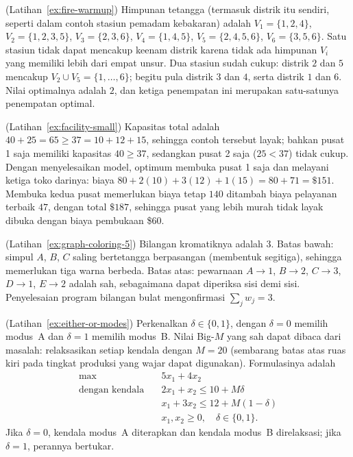 \begin{solution}(Latihan~\ref{ex:fire-warmup})
Himpunan tetangga (termasuk distrik itu sendiri, seperti dalam contoh stasiun pemadam kebakaran) adalah $V_1 = \{1,2,4\}$, $V_2 = \{1,2,3,5\}$, $V_3 = \{2,3,6\}$, $V_4 = \{1,4,5\}$, $V_5 = \{2,4,5,6\}$, $V_6 = \{3,5,6\}$. Satu stasiun tidak dapat mencakup keenam distrik karena tidak ada himpunan $V_i$ yang memiliki lebih dari empat unsur. Dua stasiun sudah cukup: distrik $2$ dan $5$ mencakup $V_2 \cup V_5 = \{1,\dots,6\}$; begitu pula distrik $3$ dan $4$, serta distrik $1$ dan $6$. Nilai optimalnya adalah $2$, dan ketiga penempatan ini merupakan satu-satunya penempatan optimal.
\end{solution}

\begin{solution}(Latihan~\ref{ex:facility-small})
Kapasitas total adalah $40 + 25 = 65 \geq 37 = 10 + 12 + 15$, sehingga contoh tersebut layak; bahkan pusat 1 saja memiliki kapasitas $40 \geq 37$, sedangkan pusat 2 saja ($25 < 37$) tidak cukup. Dengan menyelesaikan model, optimum membuka pusat 1 saja dan melayani ketiga toko darinya: biaya $80 + 2(10) + 3(12) + 1(15) = 80 + 71 = \$151$. Membuka kedua pusat memerlukan biaya tetap $140$ ditambah biaya pelayanan terbaik $47$, dengan total $\$187$, sehingga pusat yang lebih murah tidak layak dibuka dengan biaya pembukaan \$60.
\end{solution}

\begin{solution}(Latihan~\ref{ex:graph-coloring-5})
Bilangan kromatiknya adalah $3$. Batas bawah: simpul $A$, $B$, $C$ saling bertetangga berpasangan (membentuk segitiga), sehingga memerlukan tiga warna berbeda. Batas atas: pewarnaan $A \to 1$, $B \to 2$, $C \to 3$, $D \to 1$, $E \to 2$ adalah sah, sebagaimana dapat diperiksa sisi demi sisi. Penyelesaian program bilangan bulat mengonfirmasi $\sum_j w_j = 3$.
\end{solution}

\begin{solution}(Latihan~\ref{ex:either-or-modes})
Perkenalkan $\delta \in \{0,1\}$, dengan $\delta = 0$ memilih modus~A dan $\delta = 1$ memilih modus~B. Nilai Big-$M$ yang sah dapat dibaca dari masalah: relaksasikan setiap kendala dengan $M = 20$ (sembarang batas atas ruas kiri pada tingkat produksi yang wajar dapat digunakan). Formulasinya adalah
\[
\begin{aligned}
\max\quad & 5x_1 + 4x_2\\
\text{dengan kendala}\quad & 2x_1 + x_2 \leq 10 + M\delta\\
& x_1 + 3x_2 \leq 12 + M(1-\delta)\\
& x_1, x_2 \geq 0, \quad \delta \in \{0,1\}.
\end{aligned}
\]
Jika $\delta = 0$, kendala modus~A diterapkan dan kendala modus~B direlaksasi; jika $\delta = 1$, perannya bertukar.
\end{solution}

